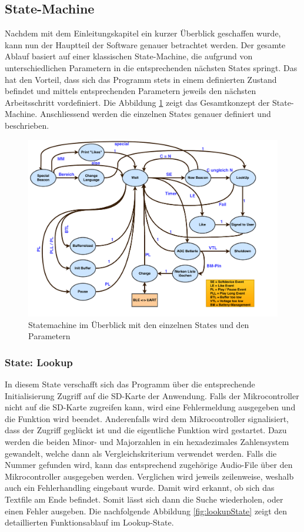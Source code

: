 \subsection{State-Machine}\label{sec:stateMachine}

Nachdem mit dem Einleitungskapitel ein kurzer Überblick geschaffen wurde, kann nun der Hauptteil der Software genauer betrachtet werden. Der gesamte Ablauf basiert auf einer klassischen State-Machine, die aufgrund von unterschiedlichen Parametern in die entsprechenden nächsten States springt. Das hat den Vorteil, dass sich das Programm stets in einem definierten Zustand befindet und mittels entsprechenden Parametern jeweils den nächsten Arbeitsschritt vordefiniert. Die Abbildung \ref{fig:completeStateMachine} zeigt das Gesamtkonzept der State-Machine. Anschliessend werden die einzelnen States genauer definiert und beschrieben.

\begin{figure}[htbp]
	\centering
	\includegraphics[width=1.15\textwidth]{Data/StateMachineFinal.pdf}
	\caption[Statemachine-Diagramm]{Statemachine im Überblick mit den einzelnen States und den Parametern}
	\label{fig:completeStateMachine}
\end{figure} 

\subsubsection*{State: Lookup}
In diesem State verschafft sich das Programm über die entsprechende Initialisierung Zugriff auf die SD-Karte der Anwendung. Falls der Mikrocontroller nicht auf die SD-Karte zugreifen kann, wird eine Fehlermeldung ausgegeben und die Funktion wird beendet. Anderenfalls wird dem Mikrocontroller signalisiert, dass der Zugriff geglückt ist und die eigentliche Funktion wird gestartet. Dazu werden die beiden Minor- und Majorzahlen in ein hexadezimales Zahlensystem gewandelt, welche dann als Vergleichskriterium verwendet werden. Falls die Nummer gefunden wird, kann das entsprechend zugehörige Audio-File über den Mikrocontroller ausgegeben werden. Verglichen wird jeweils zeilenweise, weshalb auch ein Fehlerhandling eingebaut wurde. Damit wird erkannt, ob sich das Textfile am Ende befindet. Somit lässt sich dann die Suche wiederholen, oder einen Fehler ausgeben. Die nachfolgende Abbildung \ref{fig:lookupState} zeigt den detaillierten Funktionsablauf im Lookup-State.

